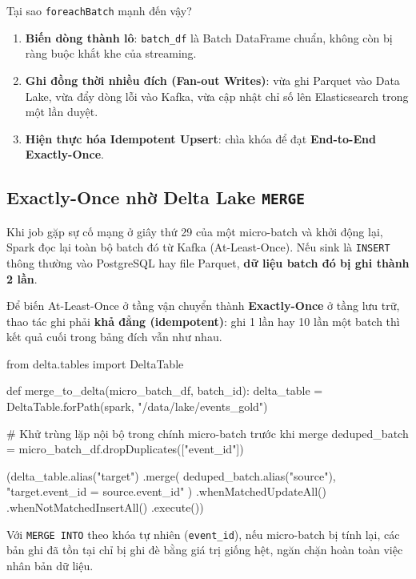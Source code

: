 \documentclass[12pt]{article}
\begin{document}
Tại sao \texttt{foreachBatch} mạnh đến vậy?
\begin{enumerate}
    \item \textbf{Biến dòng thành lô}: \texttt{batch\_df} là Batch DataFrame chuẩn, không còn bị ràng buộc khắt khe của streaming.
    \item \textbf{Ghi đồng thời nhiều đích (Fan-out Writes)}: vừa ghi Parquet vào Data Lake, vừa đẩy dòng lỗi vào Kafka, vừa cập nhật chỉ số lên Elasticsearch trong một lần duyệt.
    \item \textbf{Hiện thực hóa Idempotent Upsert}: chìa khóa để đạt \textbf{End-to-End Exactly-Once}.
\end{enumerate}

\subsection{Exactly-Once nhờ Delta Lake \texttt{MERGE}}

Khi job gặp sự cố mạng ở giây thứ 29 của một micro-batch và khởi động lại, Spark đọc lại toàn bộ batch đó từ Kafka (At-Least-Once). Nếu sink là \texttt{INSERT} thông thường vào PostgreSQL hay file Parquet, \textbf{dữ liệu batch đó bị ghi thành 2 lần}.

Để biến At-Least-Once ở tầng vận chuyển thành \textbf{Exactly-Once} ở tầng lưu trữ, thao tác ghi phải \textbf{khả đẳng (idempotent)}: ghi 1 lần hay 10 lần một batch thì kết quả cuối trong bảng đích vẫn như nhau.

\begin{aivnpybox}
from delta.tables import DeltaTable

def merge_to_delta(micro_batch_df, batch_id):
    delta_table = DeltaTable.forPath(spark, "/data/lake/events_gold")

    # Khử trùng lặp nội bộ trong chính micro-batch trước khi merge
    deduped_batch = micro_batch_df.dropDuplicates(["event_id"])

    (delta_table.alias("target")
        .merge(
            deduped_batch.alias("source"),
            "target.event_id = source.event_id"
        )
        .whenMatchedUpdateAll()
        .whenNotMatchedInsertAll()
        .execute())
\end{aivnpybox}

Với \texttt{MERGE INTO} theo khóa tự nhiên (\texttt{event\_id}), nếu micro-batch bị tính lại, các bản ghi đã tồn tại chỉ bị ghi đè bằng giá trị giống hệt, ngăn chặn hoàn toàn việc nhân bản dữ liệu.
\end{document}
